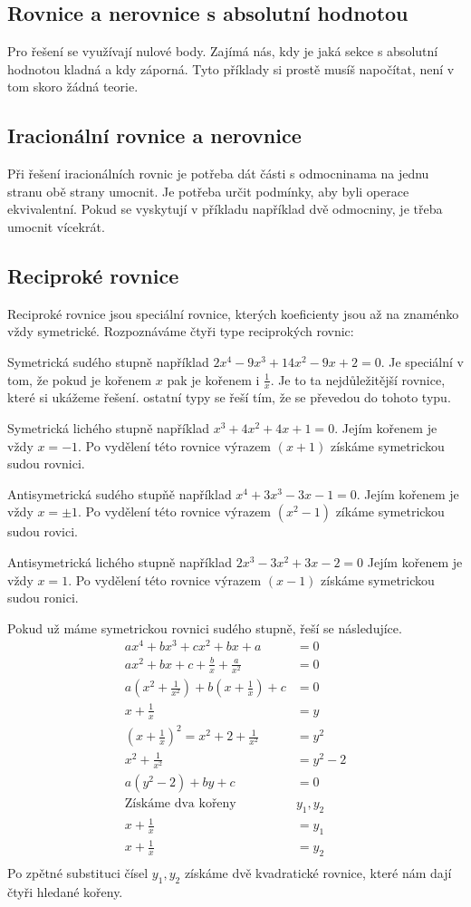 \documentclass[12pt]{article}
\begin{document}
\subsection*{Rovnice a nerovnice s absolutní hodnotou}
Pro řešení se využívají nulové body. Zajímá nás, kdy je jaká sekce s absolutní hodnotou kladná a kdy
záporná. Tyto příklady si prostě musíš napočítat, není v tom skoro žádná teorie.
\subsection*{Iracionální rovnice a nerovnice}
Při řešení iracionálních rovnic je potřeba dát části s odmocninama na jednu stranu obě strany umocnit.
Je potřeba určit podmínky, aby byli operace ekvivalentní. Pokud se vyskytují v příkladu například
dvě odmocniny, je třeba umocnit vícekrát.
\subsection*{Reciproké rovnice}
Reciproké rovnice jsou speciální rovnice, kterých koeficienty jsou až na znaménko vždy symetrické.
Rozpoznáváme čtyři type reciprokých rovnic:

Symetrická sudého stupně například $2x^4 -9x^3 + 14x^2 - 9x + 2 = 0$. Je speciální v tom, že pokud je
kořenem $x$ pak je kořenem i $\frac{1}{x}$. Je to ta nejdůležitější rovnice, které si ukážeme řešení.
ostatní typy se řeší tím, že se převedou do tohoto typu.

Symetrická lichého stupně například $x^3 + 4x^2 +4x +1 = 0$. Jejím kořenem je vždy $x = -1$. Po
vydělení této rovnice výrazem $(x+1)$ získáme symetrickou sudou rovnici.

Antisymetrická sudého stupňě například $x^4 +3x^3 -3x - 1 = 0$. Jejím kořenem je vždy $x = \pm 1$. Po
vydělení této rovnice výrazem $(x^2 -1)$ zíkáme symetrickou sudou rovici.

Antisymetrická lichého stupně například $2x^3 - 3x^2 +3x -2 = 0$ Jejím kořenem je vždy $x = 1$. Po
vydělení této rovnice výrazem $(x-1)$ získáme symetrickou sudou ronici.

Pokud už máme symetrickou rovnici sudého stupně, řeší se následujíce.
\[
\begin{aligned}
    ax^4 + bx^3 + cx^2 + bx + a &= 0 \\
    ax^2 + bx + c + \frac{b}{x} + \frac{a}{x^2} &= 0 \\
    a(x^2 + \frac{1}{x^2}) + b(x + \frac{1}{x}) + c &= 0 \\
    x + \frac{1}{x} &= y \\
    (x+\frac{1}{x})^2 = x^2 +2 + \frac{1}{x^2} &= y^2 \\
    x^2 + \frac{1}{x^2} &= y^2 - 2 \\
    a(y^2 - 2) + by + c &= 0 \\
    \text{Získáme dva kořeny } &y_1, y_2 \\
    x + \frac{1}{x} &= y_1 \\ 
    x + \frac{1}{x} &= y_2 \\
\end{aligned}
\]
Po zpětné substituci čísel $y_1, y_2$ získáme dvě kvadratické rovnice, které nám dají čtyři hledané
kořeny.
\end{document}
